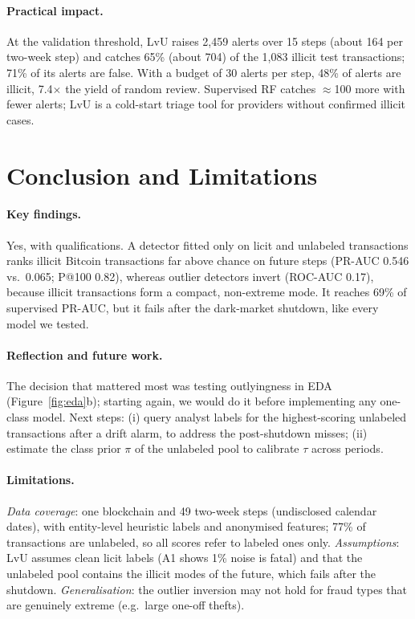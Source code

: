 \documentclass[11pt]{article}
\newcommand{\ours}{LvU}
\begin{document}
\paragraph{Practical impact.}
At the validation threshold, \ours{} raises 2,459 alerts over 15 steps (about 164 per two-week step) and catches 65\% (about 704) of the 1,083 illicit test transactions; 71\% of its alerts are false.
With a budget of 30 alerts per step, 48\% of alerts are illicit, 7.4$\times$ the yield of random review.
Supervised RF catches ${\approx}$100 more with fewer alerts; \ours{} is a cold-start triage tool for providers without confirmed illicit cases.

\section{Conclusion and Limitations}

\paragraph{Key findings.}
Yes, with qualifications.
A detector fitted only on licit and unlabeled transactions ranks illicit Bitcoin transactions far above chance on future steps (PR-AUC 0.546 vs.\ 0.065; P@100 0.82), whereas outlier detectors invert (ROC-AUC 0.17), because illicit transactions form a compact, non-extreme mode.
It reaches 69\% of supervised PR-AUC, but it fails after the dark-market shutdown, like every model we tested.

\paragraph{Reflection and future work.}
The decision that mattered most was testing outlyingness in EDA (Figure~\ref{fig:eda}b); starting again, we would do it before implementing any one-class model.
Next steps: (i) query analyst labels for the highest-scoring unlabeled transactions after a drift alarm, to address the post-shutdown misses; (ii) estimate the class prior $\pi$ of the unlabeled pool \citep{bekker2020pu} to calibrate $\tau$ across periods.

\paragraph{Limitations.}
\emph{Data coverage}: one blockchain and 49 two-week steps (undisclosed calendar dates), with entity-level heuristic labels and anonymised features; 77\% of transactions are unlabeled, so all scores refer to labeled ones only.
\emph{Assumptions}: \ours{} assumes clean licit labels (A1 shows 1\% noise is fatal) and that the unlabeled pool contains the illicit modes of the future, which fails after the shutdown.
\emph{Generalisation}: the outlier inversion may not hold for fraud types that are genuinely extreme (e.g.\ large one-off thefts).
\end{document}
